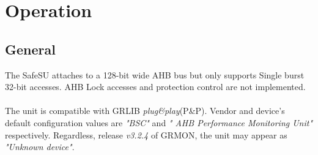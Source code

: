 \section{Operation}
\label{chapter2}
\subsection{General}
The SafeSU attaches to a 128-bit wide AHB bus but only supports Single burst 32-bit accesses. AHB Lock accesses and protection control are not implemented.\\
\\
The unit is compatible with GRLIB \textit{plug\&play}(P\&P). Vendor and device's default configuration values are  \textit{"BSC"} and \textit{" AHB Performance Monitoring Unit"} respectively. Regardless, release  \textit{v3.2.4}  of GRMON, the unit may appear as \textit{"Unknown device"}.
